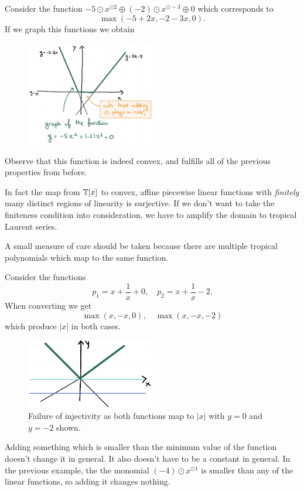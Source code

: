 \documentclass[12pt]{memoir}
\begin{document}
\begin{Ex}
    Consider the function $-5\odot x^{\odot2}\oplus(-2)\odot x^{\odot-3}\oplus 0$ which corresponds to 
    $$\max(-5+2x,-2-3x,0).$$
    If we graph this functions we obtain
    \begin{figure}[h!]
        \centering
        \includegraphics[width=0.5\textwidth]{figs/fig3-1RenzoNotes3.png}
        \label{fig:3.1-ConvPLFunc}
    \end{figure}
    Observe that this function is indeed convex, and fulfills all of the previous properties from before. 
\end{Ex}

In fact the map from $\mathbb{T}[x]$ to convex, affine piecewise linear functions with \emph{finitely} many distinct regions of linearity is surjective. If we don't want to take the finiteness condition into consideration, we have to amplify the domain to tropical Laurent series.\par 
A small measure of care should be taken because there are multiple tropical polynomials which map to the same function.

\begin{Ex}
    Consider the functions 
    $$p_1=x+\frac{1}{x}+0,\quad p_2=x+\frac1x-2.$$
    When converting we get 
    $$\max(x,-x,0),\quad\max(x,-x,-2)$$
    which produce $|x|$ in both cases.
    \begin{figure}[h!]
        \centering
        \includegraphics[width=0.5\textwidth]{figs/fig3-2RenzoNotes3.png}
        \caption{Failure of injectivity as both functions map to $|x|$ with $y=0$ and $y=-2$ shown.}
        \label{fig:3.2-InjectivityFailure}
    \end{figure}
    Adding something which is smaller than the minimum value of the function doesn't change it in general. It also doesn't have to be a constant in general. In the previous example, the the monomial $(-4)\odot x^{\odot 1}$ is smaller than any of the linear functions, so adding it changes nothing.
\end{Ex}
\end{document}
